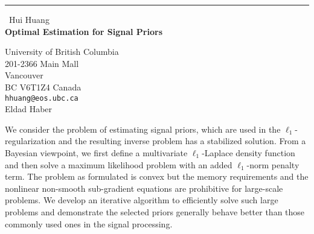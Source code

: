 \documentclass{report}
\begin{document}
\begin{center}
\rule{6in}{1pt} \
{\large Hui Huang \\
{\bf Optimal Estimation for Signal Priors}}

University of British Columbia \\ 201-2366 Main Mall \\ Vancouver \\ BC V6T1Z4 Canada
\\
{\tt hhuang@eos.ubc.ca}\\
Eldad Haber\end{center}

We consider the problem of estimating signal priors, which are used in
the $\ell_1$-regularization and the resulting inverse problem has a
stabilized solution. From a Bayesian viewpoint, we first define a
multivariate $\ell_1$-Laplace density function
and then solve a maximum likelihood problem with an added
$\ell_1$-norm penalty term. The problem as formulated is convex but
the memory requirements and the nonlinear non-smooth sub-gradient
equations are prohibitive for large-scale problems. We develop an
iterative algorithm to efficiently solve such large problems and
demonstrate the selected priors generally behave better than those
commonly used ones in the signal processing.
\end{document}
